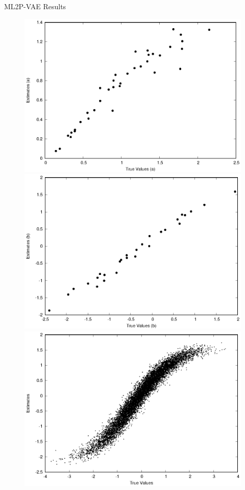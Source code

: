 \documentclass{beamer}
\theoremstyle{definition}
\begin{document}
\begin{frame}{ML2P-VAE Results}
\begin{figure}[h!]
\includegraphics[width=\textwidth]{../img/ijcnn_results/10k_a.eps}
\endminipage\hfill
{}
\includegraphics[width=\textwidth]{../img/ijcnn_results/10k_b.eps}
\endminipage\hfill
\includegraphics[width=.45\textwidth]{../img/ijcnn_results/10k_t1_scaled.eps}
\end{figure}
\end{frame}
\end{document}
